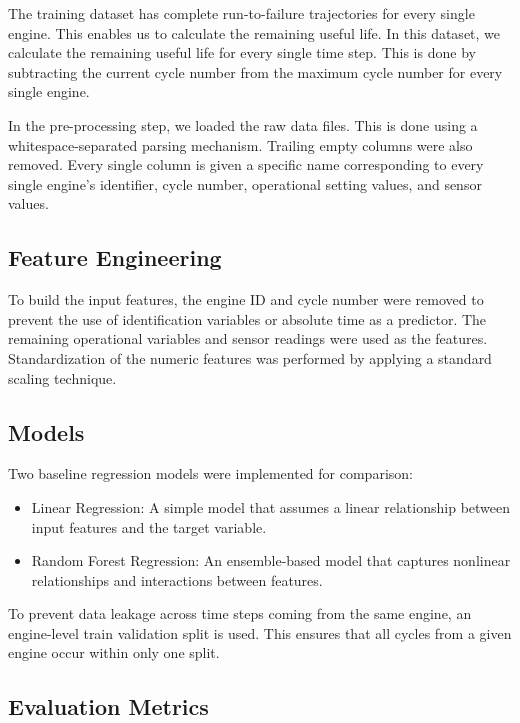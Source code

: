 \documentclass[11pt]{article}
\begin{document}
The training dataset has complete run-to-failure trajectories for every single
engine. This enables us to calculate the remaining useful life. In this dataset,
we calculate the remaining useful life for every single time step. This is done
by subtracting the current cycle number from the maximum cycle number for
every single engine.

In the pre-processing step, we loaded the raw data files. This is done using
a whitespace-separated parsing mechanism. Trailing empty columns were also
removed. Every single column is given a specific name corresponding to every
single engine's identifier, cycle number, operational setting values, and sensor
values.

\subsection{Feature Engineering}

To build the input features, the engine ID and cycle number were removed to
prevent the use of identification variables or absolute time as a predictor. The
remaining operational variables and sensor readings were used as the features.
Standardization of the numeric features was performed by applying a standard
scaling technique.

\subsection{Models}

Two baseline regression models were implemented for comparison:

\begin{itemize}
\item Linear Regression: A simple model that assumes a linear relationship
between input features and the target variable.
\item Random Forest Regression: An ensemble-based model that captures
nonlinear relationships and interactions between features.
\end{itemize}

To prevent data leakage across time steps coming from the same engine, an
engine-level train validation split is used. This ensures that all cycles from a
given engine occur within only one split.

\subsection{Evaluation Metrics}
\end{document}

